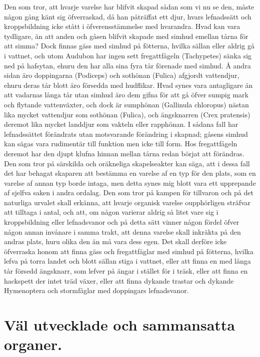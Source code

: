 Den som tror, att hvarje varelse har blifvit skapad sådan som vi nu se den, måste någon gång känt sig öfverraskad, då han påträffat ett djur, hvars lefnadssätt och kroppsbildning icke stått i öfverensstämmelse med hvarandra. Hvad kan vara tydligare, än att anden och gåsen blifvit skapade med simhud emellan tårna för att simma? Dock finnas gäss med simhud på fötterna, hvilka sällan eller aldrig gå i vattnet, och utom Audubon har ingen sett fregattfågeln (Tachypetes) sänka sig ned på hafsytan, ehuru den har alla sina fyra tår förenade med simhud. Å andra sidan äro doppingarna (Podiceps) och sothönan (Fulica) afgjordt vattendjur, ehuru deras tår blott äro försedda med hudflikar. Hvad synes vara antagligare än att vadarnas långa tår utan simhud äro dem gifna för att gå öfver sumpig mark och flytande vattenväxter, och dock är sumphönan (Gallinula chloropus) nästan lika mycket vattendjur som sothönan (Fulica), och ängsknarren (Crex pratensis) deremot lika mycket landdjur som vakteln eller rapphönan. I sådana fall har lefnadssättet förändrats utan motsvarande förändring i skapnad; gåsens simhud kan sägas vara rudimentär till funktion men icke till form. Hos fregattfågeln deremot har den djupt klufna hinnan mellan tårna redan börjat att förändras.
Den som tror på särskilda och oräkneliga skapelseakter kan säga, att i dessa fall det har behagat skaparen att bestämma en varelse af en typ för den plats, som en varelse af annan typ borde intaga, men detta synes mig blott vara ett upprepande af sjelfva saken i andra ordalag. Den som tror på kampen för tillvaron och på det naturliga urvalet skall erkänna, att hvarje organisk varelse oupphörligen sträfvar att tilltaga i antal, och att, om någon varierar aldrig så litet vare sig i kroppsbildning eller lefnadsvanor och på detta sätt vinner någon fördel öfver någon annan invånare i samma trakt, att denna varelse skall inkräkta på den andras plats, huru olika den än må vara dess egen. Det skall derföre icke öfverraska honom att finna gäss och fregattfåglar med simhud på fötterna, hvilka lefva på torra landet och blott sällan stiga i vattnet, eller att finna en med långa tår försedd ängsknarr, som lefver på ängar i stället för i träsk, eller att finna en hackspett der intet träd växer, eller att finna dykande trastar och dykande Hymenoptera och stormfåglar med doppingars lefnadsvanor.



\section[Väl utvecklade organer]{Väl utvecklade och sammansatta organer.}

